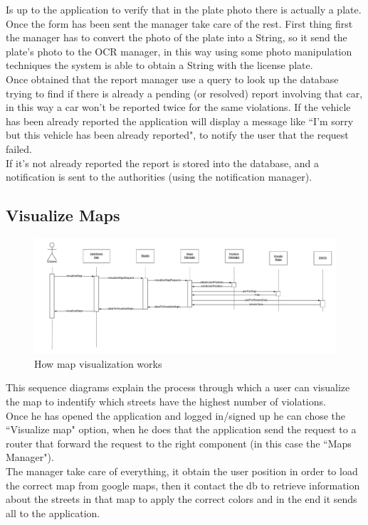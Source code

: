 \documentclass[12pt,a4paper]{report}
\begin{document}
				Is up to the application to verify that in the plate photo there is actually a plate. %
				Once the form has been sent the manager take care of the rest. First thing first the manager has to convert
				the photo of the plate into a String, so it send the plate's photo to the OCR manager, in this way using some
				photo manipulation techniques the system is able to obtain a String with the license plate.\\
				Once obtained that the report manager use a query to look up the database trying to find if there is already a
				pending (or resolved) report involving that car, in this way a car won't be reported twice for the same
				violations. If the vehicle has been already reported the application will display a message like ``I'm sorry but
				this vehicle has been already reported", to notify the user that the request failed.\\
				If it's not already reported the report is stored into the database, and a notification is sent to the authorities
				(using the notification manager).
			\subsection{Visualize Maps}
				\begin{figure}[H]
						\includegraphics[width = \textwidth, center]{Maps}
						\caption{How map visualization works}
						\label{fig: diagrams}
				\end{figure}

				This sequence diagrams explain the process through which a user can visualize the map to indentify which
				streets have the highest number of violations.\\
				Once he has opened the application and logged in/signed up he can chose the ``Visualize map" option,
				when he does that the application send the request to a router that forward the request to the right
				component (in this case the ``Maps Manager").\\
				The manager take care of everything, it obtain the user position in order to load the correct map from google
				maps, then it contact the db to retrieve information about the streets in that map to apply the correct colors
				and in the end it sends all to the application.
\end{document}
